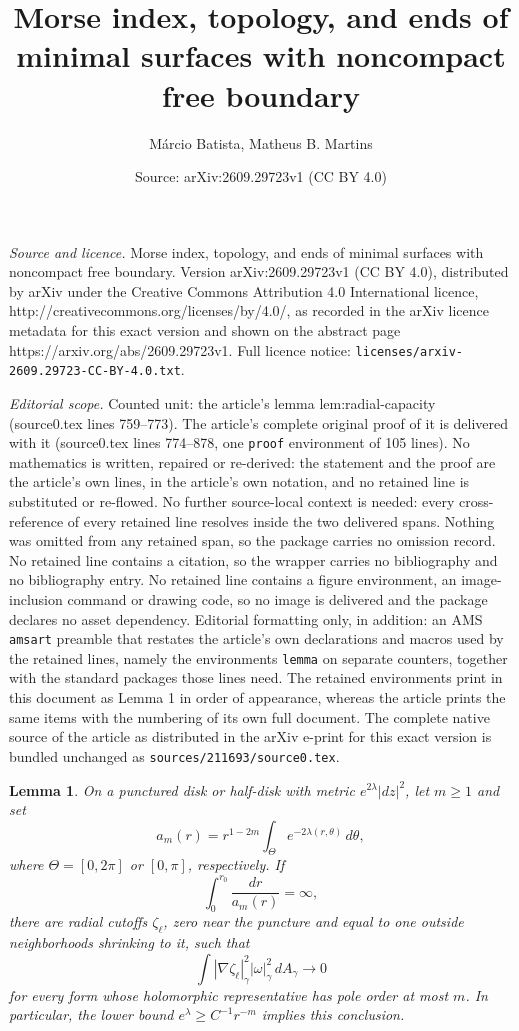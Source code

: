 \documentclass[10pt,a4paper]{amsart}
\title{Morse index, topology, and ends of minimal surfaces with noncompact free boundary}
\author{M\'arcio Batista, Matheus B. Martins}
\date{Source: arXiv:2609.29723v1 (CC BY 4.0)}
\newtheorem{lemma}{Lemma}
\begin{document}
\maketitle

\noindent\emph{Source and licence.} Morse index, topology, and ends of minimal surfaces with noncompact free boundary. Version arXiv:2609.29723v1 (CC BY 4.0), distributed by arXiv under the Creative Commons Attribution 4.0 International licence, http://creativecommons.org/licenses/by/4.0/, as recorded in the arXiv licence metadata for this exact version and shown on the abstract page https://arxiv.org/abs/2609.29723v1. Full licence notice: \texttt{licenses/arxiv-2609.29723-CC-BY-4.0.txt}.\par\smallskip

\noindent\textit{Editorial scope.} Counted unit: the article's lemma lem:radial-capacity (source0.tex lines 759--773). The article's complete original proof of it is delivered with it (source0.tex lines 774--878, one \texttt{proof} environment of 105 lines). No mathematics is written, repaired or re-derived: the statement and the proof are the article's own lines, in the article's own notation, and no retained line is substituted or re-flowed.  No further source-local context is needed: every cross-reference of every retained line resolves inside the two delivered spans.  Nothing was omitted from any retained span, so the package carries no omission record.  No retained line contains a citation, so the wrapper carries no bibliography and no bibliography entry.  No retained line contains a figure environment, an image-inclusion command or drawing code, so no image is delivered and the package declares no asset dependency.  Editorial formatting only, in addition: an AMS \texttt{amsart} preamble that restates the article's own declarations and macros used by the retained lines, namely the environments \texttt{lemma} on separate counters, together with the standard packages those lines need.  The retained environments print in this document as Lemma 1 in order of appearance, whereas the article prints the same items with the numbering of its own full document.  The complete native source of the article as distributed in the arXiv e-print for this exact version is bundled unchanged as \texttt{sources/211693/source0.tex}.
\begin{lemma}\label{lem:radial-capacity}
On a punctured disk or half-disk with metric $e^{2\lambda}|dz|^2$, let $m\ge1$ and set
\[
a_m(r)=r^{1-2m}\int_{\Theta}e^{-2\lambda(r,\theta)}\,d\theta,
\]
where $\Theta=[0,2\pi]$ or $[0,\pi]$, respectively. If
\begin{equation}\label{eq:capacity-condition}
\int_0^{r_0}\frac{dr}{a_m(r)}=\infty,
\end{equation}
there are radial cutoffs $\zeta_\ell$, zero near the puncture and equal to one outside neighborhoods shrinking to it, such that
\[
\int |\nabla\zeta_\ell|_\gamma^2|\omega|_\gamma^2\,dA_\gamma\longrightarrow0
\]
for every form whose holomorphic representative has pole order at most $m$. In particular, the lower bound $e^\lambda\ge C^{-1}r^{-m}$ implies this conclusion.
\end{lemma}
\end{document}
